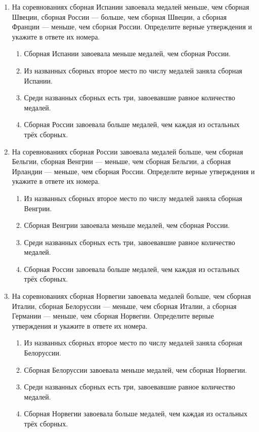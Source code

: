 \documentclass[a4paper,12pt]{article}
\newcommand{\taskspace}{\par\vspace{0.42cm}}
\begin{document}
\begin{enumerate}[resume]
\taskspace

\item На соревнованиях сборная Испании завоевала медалей меньше, чем сборная Швеции, сборная России --- больше, чем сборная Швеции, а сборная Франции --- меньше, чем сборная России. Определите верные утверждения и укажите в ответе их номера.
\begin{enumerate}[label=\arabic*),leftmargin=8mm,itemsep=0.25em,topsep=0.35em]
\item Сборная Испании завоевала меньше медалей, чем сборная России.
\item Из названных сборных второе место по числу медалей заняла сборная Испании.
\item Среди названных сборных есть три, завоевавшие равное количество медалей.
\item Сборная России завоевала больше медалей, чем каждая из остальных трёх сборных.
\end{enumerate}

\taskspace

\item На соревнованиях сборная России завоевала медалей больше, чем сборная Бельгии, сборная Венгрии --- меньше, чем сборная Бельгии, а сборная Ирландии --- меньше, чем сборная России. Определите верные утверждения и укажите в ответе их номера.
\begin{enumerate}[label=\arabic*),leftmargin=8mm,itemsep=0.25em,topsep=0.35em]
\item Из названных сборных второе место по числу медалей заняла сборная Венгрии.
\item Сборная Венгрии завоевала меньше медалей, чем сборная России.
\item Среди названных сборных есть три, завоевавшие равное количество медалей.
\item Сборная России завоевала больше медалей, чем каждая из остальных трёх сборных.
\end{enumerate}

\taskspace

\item На соревнованиях сборная Норвегии завоевала медалей больше, чем сборная Италии, сборная Белоруссии --- меньше, чем сборная Италии, а сборная Германии --- меньше, чем сборная Норвегии. Определите верные утверждения и укажите в ответе их номера.
\begin{enumerate}[label=\arabic*),leftmargin=8mm,itemsep=0.25em,topsep=0.35em]
\item Из названных сборных второе место по числу медалей заняла сборная Белоруссии.
\item Сборная Белоруссии завоевала меньше медалей, чем сборная Норвегии.
\item Среди названных сборных есть три, завоевавшие равное количество медалей.
\item Сборная Норвегии завоевала больше медалей, чем каждая из остальных трёх сборных.
\end{enumerate}


\end{enumerate}
\end{document}
